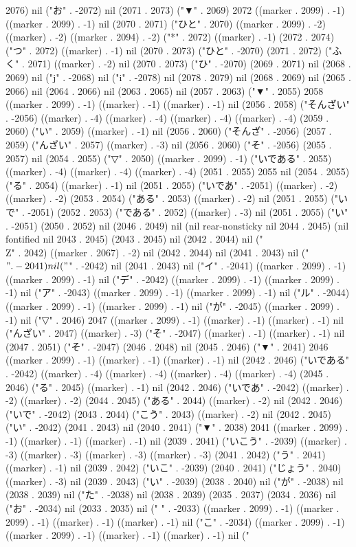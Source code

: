 2076) nil ("お" . -2072) nil (2071 . 2073) ("▼" . 2069) 2072 ((marker . 2099) . -1) ((marker . 2099) . -1) nil (2070 . 2071) ("ひと" . 2070) ((marker . 2099) . -2) ((marker) . -2) ((marker . 2094) . -2) ("*" . 2072) ((marker) . -1) (2072 . 2074) ("つ" . 2072) ((marker) . -1) nil (2070 . 2073) ("ひと" . -2070) (2071 . 2072) ("ふく" . 2071) ((marker) . -2) nil (2070 . 2073) ("ひ" . -2070) (2069 . 2071) nil (2068 . 2069) nil ("j" . -2068) nil ("i" . -2078) nil (2078 . 2079) nil (2068 . 2069) nil (2065 . 2066) nil (2064 . 2066) nil (2063 . 2065) nil (2057 . 2063) ("▼" . 2055) 2058 ((marker . 2099) . -1) ((marker) . -1) ((marker) . -1) nil (2056 . 2058) ("そんざい" . -2056) ((marker) . -4) ((marker) . -4) ((marker) . -4) ((marker) . -4) (2059 . 2060) ("い" . 2059) ((marker) . -1) nil (2056 . 2060) ("そんざ" . -2056) (2057 . 2059) ("んざい" . 2057) ((marker) . -3) nil (2056 . 2060) ("そ" . -2056) (2055 . 2057) nil (2054 . 2055) ("▽" . 2050) ((marker . 2099) . -1) ("いである" . 2055) ((marker) . -4) ((marker) . -4) ((marker) . -4) (2051 . 2055) 2055 nil (2054 . 2055) ("る" . 2054) ((marker) . -1) nil (2051 . 2055) ("いであ" . -2051) ((marker) . -2) ((marker) . -2) (2053 . 2054) ("ある" . 2053) ((marker) . -2) nil (2051 . 2055) ("いで" . -2051) (2052 . 2053) ("である" . 2052) ((marker) . -3) nil (2051 . 2055) ("い" . -2051) (2050 . 2052) nil (2046 . 2049) nil (nil rear-nonsticky nil 2044 . 2045) (nil fontified nil 2043 . 2045) (2043 . 2045) nil (2042 . 2044) nil ("\\Z" . 2042) ((marker . 2067) . -2) nil (2042 . 2044) nil (2041 . 2043) nil ("$" . -2041) nil ("$" . -2042) nil (2041 . 2043) nil ("イ" . -2041) ((marker . 2099) . -1) ((marker . 2099) . -1) nil ("デ" . -2042) ((marker . 2099) . -1) ((marker . 2099) . -1) nil ("ア" . -2043) ((marker . 2099) . -1) ((marker . 2099) . -1) nil ("ル" . -2044) ((marker . 2099) . -1) ((marker . 2099) . -1) nil ("が" . -2045) ((marker . 2099) . -1) nil ("▽" . 2046) 2047 ((marker . 2099) . -1) ((marker) . -1) ((marker) . -1) nil ("んざい" . 2047) ((marker) . -3) ("そ" . -2047) ((marker) . -1) ((marker) . -1) nil (2047 . 2051) ("そ" . -2047) (2046 . 2048) nil (2045 . 2046) ("▼" . 2041) 2046 ((marker . 2099) . -1) ((marker) . -1) ((marker) . -1) nil (2042 . 2046) ("いである" . -2042) ((marker) . -4) ((marker) . -4) ((marker) . -4) ((marker) . -4) (2045 . 2046) ("る" . 2045) ((marker) . -1) nil (2042 . 2046) ("いであ" . -2042) ((marker) . -2) ((marker) . -2) (2044 . 2045) ("ある" . 2044) ((marker) . -2) nil (2042 . 2046) ("いで" . -2042) (2043 . 2044) ("こう" . 2043) ((marker) . -2) nil (2042 . 2045) ("い" . -2042) (2041 . 2043) nil (2040 . 2041) ("▼" . 2038) 2041 ((marker . 2099) . -1) ((marker) . -1) ((marker) . -1) nil (2039 . 2041) ("いこう" . -2039) ((marker) . -3) ((marker) . -3) ((marker) . -3) ((marker) . -3) (2041 . 2042) ("う" . 2041) ((marker) . -1) nil (2039 . 2042) ("いこ" . -2039) (2040 . 2041) ("じょう" . 2040) ((marker) . -3) nil (2039 . 2043) ("い" . -2039) (2038 . 2040) nil ("が" . -2038) nil (2038 . 2039) nil ("た" . -2038) nil (2038 . 2039) (2035 . 2037) (2034 . 2036) nil ("お" . -2034) nil (2033 . 2035) nil (" " . -2033) ((marker . 2099) . -1) ((marker . 2099) . -1) ((marker) . -1) ((marker) . -1) nil ("こ" . -2034) ((marker . 2099) . -1) ((marker . 2099) . -1) ((marker) . -1) ((marker) . -1) nil ("
